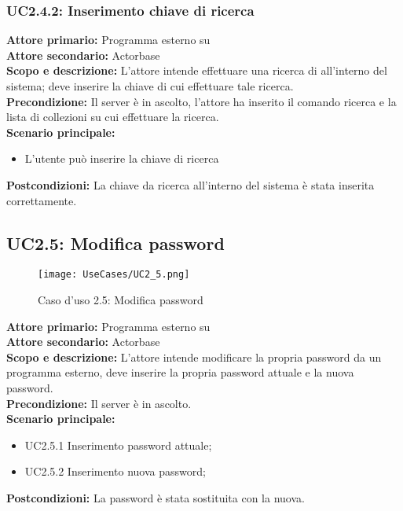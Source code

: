 \documentclass{scalatekids-article}
\begin{document}
\subsubsection{UC2.4.2: Inserimento chiave di ricerca}

\textbf{Attore primario:} Programma esterno su \\
\textbf{Attore secondario:} Actorbase\\
\textbf{Scopo e descrizione:} L'attore intende effettuare una ricerca di  all'interno del sistema; deve inserire la chiave di cui effettuare tale ricerca.\\
\textbf{Precondizione:} Il server è in ascolto, l'attore ha inserito il comando ricerca e la lista di collezioni su cui effettuare la ricerca.\\
\textbf{Scenario principale:}
\begin{itemize}
\item L'utente può inserire la chiave di ricerca
\end{itemize}
\textbf{Postcondizioni:} La chiave da ricerca all'interno del sistema è stata inserita correttamente.

\subsection{UC2.5: Modifica password}

\begin{figure}[H]
  \begin{center}
    \texttt{[image: UseCases/UC2\_5.png]}
    \caption{Caso d'uso 2.5: Modifica password}
  \end{center}
\end{figure}
\textbf{Attore primario:} Programma esterno su \\
\textbf{Attore secondario:} Actorbase\\
\textbf{Scopo e descrizione:} L'attore intende modificare la propria password da un programma  esterno, deve inserire la propria password attuale e la nuova password.\\
\textbf{Precondizione:} Il server è in ascolto.\\
\textbf{Scenario principale:}
\begin{itemize}
\item UC2.5.1 Inserimento password attuale;
\item UC2.5.2 Inserimento nuova password;
\end{itemize}
\textbf{Postcondizioni:} La password è stata sostituita con la nuova.
\end{document}

